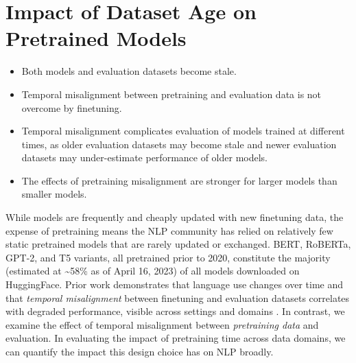 \documentclass{article}
\begin{document}
\vspace{-3mm}
\section{Impact of Dataset Age on Pretrained Models}
\label{sec:time}

\begin{tcolorbox}[width=\textwidth,title={Section Findings}] %
\vspace{-2mm}
\begin{itemize}[itemsep=0pt, wide=3pt]
    \item Both models and evaluation datasets become stale.
    \item Temporal misalignment between pretraining and evaluation data is not overcome by finetuning.%
    \item
    Temporal misalignment complicates evaluation of models trained at different times, as older evaluation datasets may become stale and newer evaluation datasets may under-estimate performance of older models. 
    \item The effects of pretraining misalignment are stronger for larger models than smaller models. %
\end{itemize}
\end{tcolorbox}

While models are frequently and cheaply updated with new finetuning data, the expense of pretraining means the NLP community has relied on relatively few static pretrained models that are rarely updated or exchanged.
BERT, RoBERTa, GPT-2, and T5 variants, all pretrained prior to 2020, constitute the majority (estimated at \textasciitilde58\% as of April 16, 2023) of all models downloaded on HuggingFace.
Prior work demonstrates that language use changes over time \citep{altmann2009beyond,labov2011principles} and that \emph{temporal misalignment} between finetuning and evaluation datasets correlates with degraded performance, visible across settings and domains \citep{luu2021time,lazaridou2021mind,agarwal2022temporal,jang2022temporalwiki}.
In contrast, we examine the effect of temporal misalignment between \emph{pretraining data} and evaluation.
In evaluating the impact of pretraining time across data domains, we can quantify the impact this design choice has on NLP broadly.
\end{document}
